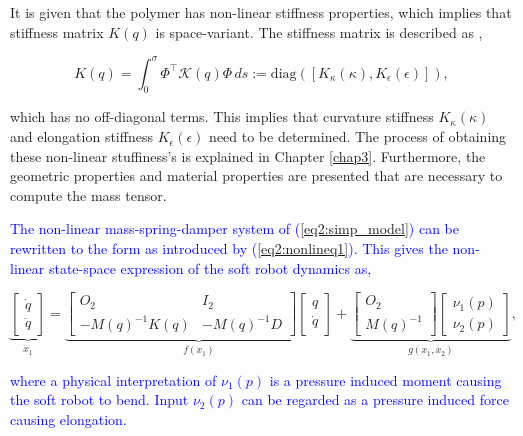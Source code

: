 It is given that the polymer has non-linear stiffness properties, which implies that stiffness matrix $K(q)$ is space-variant. The stiffness matrix is described as \textcolor{blue}{\cite{Caasenbrood2020}},

\begin{equation}
    K(q) = \int_0^\sigma \Phi^\top \mathcal{K}(q) \Phi \hspace{2pt} ds := \text{diag}([K_\kappa(\kappa), K_\epsilon(\epsilon)]),
\end{equation}

which has no off-diagonal terms. This implies that curvature stiffness $K_\kappa(\kappa)$ and elongation stiffness $K_\epsilon(\epsilon)$ need to be determined. The process of obtaining these non-linear stuffiness's is explained in Chapter \ref{chap3}. Furthermore, the geometric properties and material properties are presented that are necessary to compute the mass tensor. 

\textcolor{blue}{The non-linear mass-spring-damper system of (\ref{eq2:simp_model}) can be rewritten to the form as introduced by (\ref{eq2:nonlineq1}). This gives the non-linear state-space expression of the soft robot dynamics as,}


\begin{equation}
    \underbrace{\begin{bmatrix}\dot{q}\\ \ddot{q}  \end{bmatrix}}_{\dot{x}_1}   = \underbrace{  \begin{bmatrix} O_{2} & I_{2} \\ -M(q)^{-1}K(q)  & -M(q)^{-1} D \end{bmatrix}   \begin{bmatrix} q \\ \dot{q} \end{bmatrix} }_{f(x_1)}  +      \underbrace{ \begin{bmatrix} O_{2} \\ M(q)^{-1}   \end{bmatrix}       \begin{bmatrix} \nu_1(p) \\ \nu_2(p)  
    \end{bmatrix} }_{g(x_1,x_2)}, 
    \label{eq4:SS}
\end{equation}

\textcolor{blue}{where a physical interpretation of $\nu_1(p)$ is a pressure induced moment causing the soft robot to bend. Input $\nu_2(p)$ can be regarded as a pressure induced force causing elongation.}



